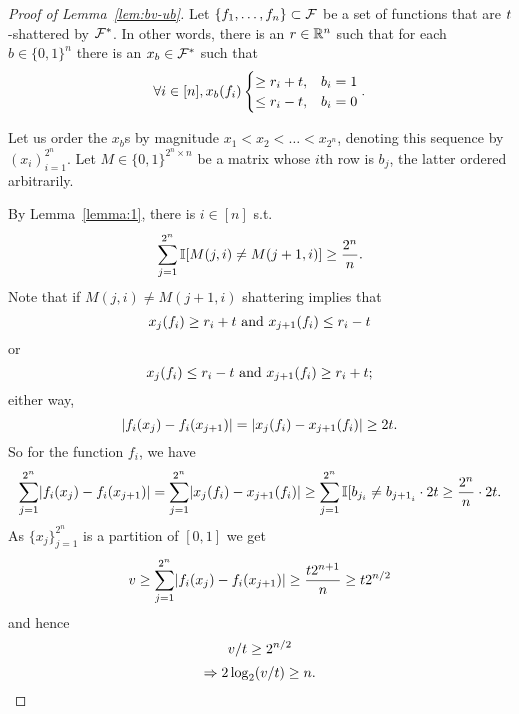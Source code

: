 \documentclass[12pt,a4paper,oneside,onecolumn]{book}
\begin{document}
\begin{proof}[Proof of Lemma~\ref{lem:bv-ub}]
  Let $\set{f_1,\ldots,f_n}\subset \F$ be a set of functions that are $\gammat$-shattered by $\F^*$.
  In other words, there is an $r\in\R^n$
  such that for each
  $b \in \{0,1\}^n$
there is an $x_b
\in\F^*$
such that
\[\forall i \in [n] ,
  x_b(f_i)
  \begin{cases}
    \geq r_i + \gammat, & b_i = 1 \\
    \leq r_i - \gammat, & b_i = 0
  \end{cases}
  .
\]

Let us order the $x_b$s by
magnitude
$x_1<x_2<\ldots<x_{2^n}$,
denoting this sequence by
$(x_i)_{i=1}^{2^n}$.
Let $M \in \{0,1\}^{2^n \times n}$ be a matrix whose $i$th row is $b_j$,
the latter ordered arbitrarily.

By Lemma~\ref{lemma:1}, there is $i \in [n]$ s.t. 
\[\sum_{j=1}^{2^n} \ind[M(j,i) \neq M(j+1,i)] \geq \frac{2^n}{n}.\]
Note that if
$M(j,i) \neq M(j+1,i)$ shattering implies that
\[x_j(f_i) \geq r_i + \gammat \text{ and } x_{j+1}(f_i) \leq r_i - \gammat\]
or
\[x_j(f_i) \leq r_i - \gammat \text{ and } x_{j+1}(f_i) \geq r_i + \gammat;\]
either way,
\[\abs*{f_i(x_j) - f_i(x_{j+1})} = \abs*{x_j(f_i) - x_{j+1}(f_i)} \geq 2\gammat.\]
So
for the function
$f_i$,
we have
\begin{eqnarray*}
  \sum_{j=1}^{2^n} \abs*{f_i(x_j) - f_i(x_{j+1})} = \sum_{j=1}^{2^n} \abs*{x_j(f_i) - x_{j+1}(f_i)} 
  \geq \sum_{j=1}^{2^n} \ind[b_{j_i} \neq b_{{j+1}_i} \cdot 2\gammat 
  \geq \frac{2^n}{n} \cdot 2\gammat.
\end{eqnarray*}
As $\{x_j\}_{j=1}^{2^n}$ is a partition of $[0,1]$ we get
\[v \geq \sum_{j=1}^{2^n} \abs*{f_i(x_j) - f_i(x_{j+1})} \geq  \frac{\gammat 2^{n+1}}{n} \geq \gammat 2^{n/2}\]
and hence
\[v/\gammat \geq 2^{n/2}\]
\[\Rightarrow 2\log_2(v/\gammat) \geq n.\]
\end{proof}
\end{document}
